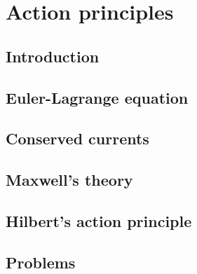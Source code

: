 \chapter{Action principles}

\section{Introduction}

\section{Euler-Lagrange equation}

\section{Conserved currents}

\section{Maxwell's theory}

\section{Hilbert's action principle}

\section{Problems}

